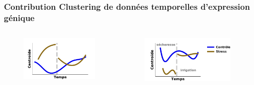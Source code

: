 \documentclass[11pt,xcolor=dvipsnames]{beamer}
\begin{document}
\begin{frame}
\frametitle{Contribution \quad Clustering de données temporelles
d'expression génique}
\vspace{-1em}
\begin{columns}
\begin{column}{0.5\linewidth}
\begin{figure}
\includegraphics[width=0.9\linewidth]{figures/bipartite_centroids.pdf}
\end{figure}
\end{column}
\begin{column}{0.5\linewidth}
\begin{figure}
\includegraphics[width=0.9\linewidth]{figures/amf_centroids.pdf}
\end{figure}
\end{column}
\end{columns}

\vspace{1.5em}
\begin{overlayarea}{12cm}{5cm}
\end{overlayarea}
\end{frame}
\end{document}
